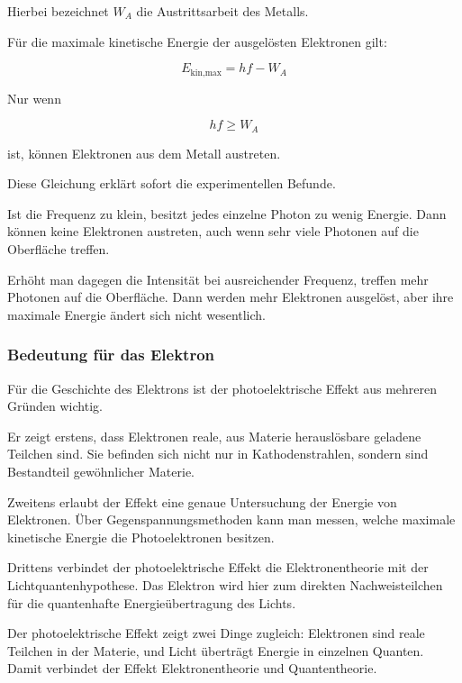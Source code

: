 Hierbei bezeichnet \(W_A\) die Austrittsarbeit des Metalls.

\begin{MathBox}
	\label{box:einstein-gleichung-photoeffekt}
	Für die maximale kinetische Energie der ausgelösten Elektronen gilt:
	
	\[
	E_{\text{kin,max}} = h f - W_A
	\]
	
	Nur wenn
	
	\[
	h f \geq W_A
	\]
	
	ist, können Elektronen aus dem Metall austreten.
\end{MathBox}

Diese Gleichung erklärt sofort die experimentellen Befunde.

Ist die Frequenz zu klein, besitzt jedes einzelne Photon zu wenig Energie.
Dann können keine Elektronen austreten, auch wenn sehr viele Photonen
auf die Oberfläche treffen.

Erhöht man dagegen die Intensität bei ausreichender Frequenz,
treffen mehr Photonen auf die Oberfläche.
Dann werden mehr Elektronen ausgelöst, aber ihre maximale Energie
ändert sich nicht wesentlich.

\subsubsection{Bedeutung für das Elektron}

Für die Geschichte des Elektrons ist der photoelektrische Effekt
aus mehreren Gründen wichtig.

Er zeigt erstens, dass Elektronen reale, aus Materie herauslösbare
geladene Teilchen sind. Sie befinden sich nicht nur in Kathodenstrahlen,
sondern sind Bestandteil gewöhnlicher Materie.

Zweitens erlaubt der Effekt eine genaue Untersuchung der Energie von
Elektronen. Über Gegenspannungsmethoden kann man messen,
welche maximale kinetische Energie die Photoelektronen besitzen.

Drittens verbindet der photoelektrische Effekt die Elektronentheorie
mit der Lichtquantenhypothese. Das Elektron wird hier zum direkten
Nachweisteilchen für die quantenhafte Energieübertragung des Lichts.

\begin{DidacticBox}
	\label{box:bedeutung-photoeffekt-elektron}
	Der photoelektrische Effekt zeigt zwei Dinge zugleich:
	Elektronen sind reale Teilchen in der Materie,
	und Licht überträgt Energie in einzelnen Quanten.
	Damit verbindet der Effekt Elektronentheorie und Quantentheorie.
\end{DidacticBox}

